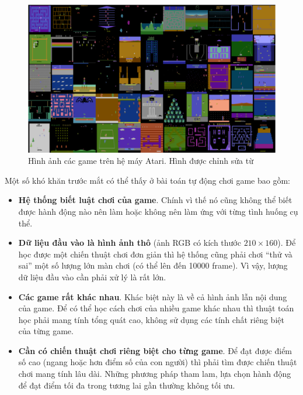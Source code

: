 \begin{figure}
	\centering
	\includegraphics[width=\textwidth]{ale_55_games}
	\caption[Hình ảnh các game trên hệ máy Atari]{Hình ảnh các game trên hệ máy Atari.
	Hình được chỉnh sửa từ \cite{defazio2014comparison}}
	\label{Ale55Games}
\end{figure}

Một số khó khăn trước mắt có thể thấy ở bài toán tự động chơi game bao gồm:
\begin{itemize}
	\item \textbf{Hệ thống biết luật chơi của game}. 
	Chính vì thế nó cũng không thể biết được hành động nào nên làm hoặc không nên làm ứng với từng tình huống cụ thể.
	\item \textbf{Dữ liệu đầu vào là hình ảnh thô} (ảnh RGB có kích thước $210\times160$). 
	Để học được một chiến thuật chơi đơn giản thì hệ thống cũng phải chơi ``thử và sai'' một số lượng lớn màn chơi (có thể lên đến 10000 frame). 
	Vì vậy, lượng dữ liệu đầu vào cần phải xử lý là rất lớn.
	\item \textbf{Các game rất khác nhau}.
	Khác biệt này là về cả hình ảnh lẫn nội dung của game.
	Để có thể học cách chơi của nhiều game khác nhau thì thuật toán học phải mang tính tổng quát cao, không sử dụng các tính chất riêng biệt của từng game.
	\item \textbf{Cần có chiến thuật chơi riêng biệt cho từng game}.
	Để đạt được điểm số cao (ngang hoặc hơn điểm số của con người) thì phải tìm được chiến thuật chơi mang tính lâu dài. 
	Những phương pháp tham lam, lựa chọn hành động để đạt điểm tối đa trong tương lai gần thường không tối ưu.
\end{itemize}


